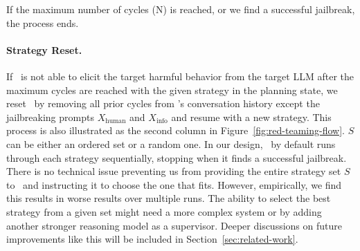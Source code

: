 If the maximum number of cycles (N) is reached, or we find a successful jailbreak, the process ends. 




\paragraph{Strategy Reset.} If \methodname~is not able to elicit the target harmful behavior from the target LLM after the maximum cycles are reached with the given strategy in the planning state, we reset \methodname~by removing all prior cycles from \methodname's conversation history except the jailbreaking prompts $X_{\text{human}}$ and $X_{\text{info}}$ and resume with a new strategy. This process is also illustrated as the second column in Figure~\ref{fig:red-teaming-flow}. $S$ can be either an ordered set or a random one. In our design, \methodname~by default runs through each strategy sequentially, stopping when it finds a successful jailbreak. There is no technical issue preventing us from providing the entire strategy set $S$ to \methodname~and instructing it to choose the one that fits. However, empirically, we find this results in worse results over multiple runs. The ability to select the best strategy from a given set might need a more complex system or by adding another stronger reasoning model as a supervisor. Deeper discussions on future improvements like this will be included in Section~\ref{sec:related-work}.


